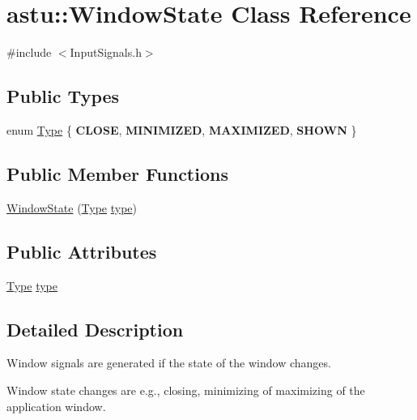 \hypertarget{classastu_1_1WindowState}{}\section{astu\+:\+:Window\+State Class Reference}
\label{classastu_1_1WindowState}


{\ttfamily \#include $<$Input\+Signals.\+h$>$}

\subsection*{Public Types}
\begin{DoxyCompactItemize}
\item 
enum \hyperlink{classastu_1_1WindowState_ae7ebaae8631a7957bd576aabc3914036}{Type} \{ {\bfseries C\+L\+O\+SE}, 
{\bfseries M\+I\+N\+I\+M\+I\+Z\+ED}, 
{\bfseries M\+A\+X\+I\+M\+I\+Z\+ED}, 
{\bfseries S\+H\+O\+WN}
 \}
\end{DoxyCompactItemize}
\subsection*{Public Member Functions}
\begin{DoxyCompactItemize}
\item 
\hyperlink{classastu_1_1WindowState_ad6abadc59ec82b5846166138448edbf9}{Window\+State} (\hyperlink{classastu_1_1WindowState_ae7ebaae8631a7957bd576aabc3914036}{Type} \hyperlink{classastu_1_1WindowState_a41b05b74477652065da5008633249307}{type})
\end{DoxyCompactItemize}
\subsection*{Public Attributes}
\begin{DoxyCompactItemize}
\item 
\hyperlink{classastu_1_1WindowState_ae7ebaae8631a7957bd576aabc3914036}{Type} \hyperlink{classastu_1_1WindowState_a41b05b74477652065da5008633249307}{type}
\end{DoxyCompactItemize}


\subsection{Detailed Description}
Window signals are generated if the state of the window changes.

Window state changes are e.\+g., closing, minimizing of maximizing of the application window. 

